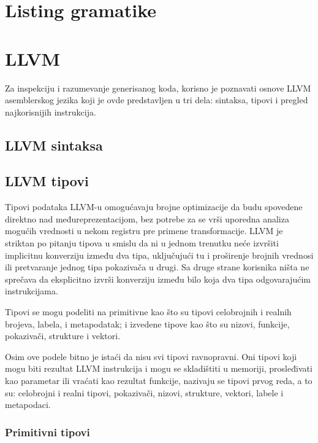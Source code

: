 
\appendix

\chapter{Listing gramatike}
\lstset{
  basicstyle=\footnotesize
}



\chapter{LLVM}

Za inspekciju i razumevanje generisanog koda, korisno je poznavati osnove LLVM asemblerskog jezika koji je ovde predstavljen u tri dela: sintaksa, tipovi i pregled najkorisnijih instrukcija.


\section{LLVM sintaksa}

\section{LLVM tipovi}

Tipovi podataka LLVM-u omogućavaju brojne optimizacije da budu spovedene direktno nad međureprezentacijom, 
bez potrebe za se vrši uporedna analiza mogućih vrednosti u nekom registru pre primene transformacije.
LLVM je striktan po pitanju tipova u smislu da ni u jednom trenutku neće izvršiti implicitnu konverziju između dva tipa, 
uključujući tu i proširenje brojnih vrednosi ili pretvaranje jednog tipa pokazivača u drugi. 
Sa druge strane korisnika ništa ne sprečava da eksplicitno izvrši konverziju između bilo koja dva tipa odgovarajućim instrukcijama.

Tipovi se mogu podeliti na primitivne kao što su tipovi celobrojnih i realnih brojeva, labela, i metapodatak; 
i izvedene tipove kao što su nizovi, funkcije, pokazivači, strukture i vektori.

Osim ove podele bitno je istaći da nisu svi tipovi ravnopravni.
Oni tipovi koji mogu biti rezultat LLVM instrukcija i mogu se skladištiti u memoriji, prosleđivati kao parametar ili vraćati kao rezultat funkcije, nazivaju se tipovi prvog reda, a to su: celobrojni i realni tipovi, pokazivači, nizovi, strukture, vektori, labele i metapodaci.


\subsection*{Primitivni tipovi}

